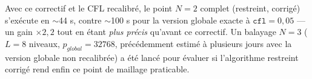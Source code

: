 \documentclass[11pt]{article}
\begin{document}
Avec ce correctif et le CFL recalibré, le point $N=2$ complet
(restreint, corrigé) s'exécute en $\sim$44 s, contre $\sim$100 s pour
la version globale exacte à $\texttt{cfl}=0{,}05$ --- un gain
$\times2{,}2$ tout en étant \emph{plus précis} qu'avant ce correctif.
Un balayage $N=3$ ($L=8$ niveaux, $p_{global}=32768$, précédemment
estimé à plusieurs jours avec la version globale non recalibrée) a été
lancé pour évaluer si l'algorithme restreint corrigé rend enfin ce
point de maillage praticable.
\end{document}
